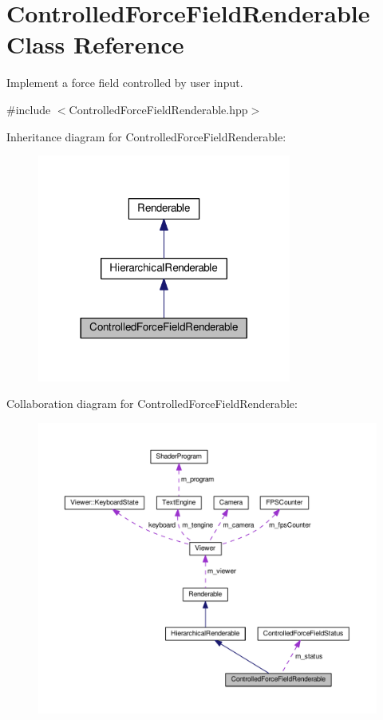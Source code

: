 \hypertarget{classControlledForceFieldRenderable}{\section{Controlled\+Force\+Field\+Renderable Class Reference}
\label{classControlledForceFieldRenderable}
}


Implement a force field controlled by user input.  




{\ttfamily \#include $<$Controlled\+Force\+Field\+Renderable.\+hpp$>$}



Inheritance diagram for Controlled\+Force\+Field\+Renderable\+:\nopagebreak
\begin{figure}[H]
\begin{center}
\leavevmode
\includegraphics[width=236pt]{classControlledForceFieldRenderable__inherit__graph}
\end{center}
\end{figure}


Collaboration diagram for Controlled\+Force\+Field\+Renderable\+:\nopagebreak
\begin{figure}[H]
\begin{center}
\leavevmode
\includegraphics[width=350pt]{classControlledForceFieldRenderable__coll__graph}
\end{center}
\end{figure}
